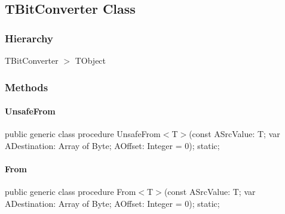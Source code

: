 \documentclass{report}
\newif\ifpdf
\begin{document}
\subsection*{TBitConverter Class}
\fi
\label{ok_generic.TBitConverter}
\subsubsection*{\large{\textbf{Hierarchy}}\normalsize\hspace{1ex}\hfill}
TBitConverter {$>$} TObject
\subsubsection*{\large{\textbf{Methods}}\normalsize\hspace{1ex}\hfill}
\paragraph*{UnsafeFrom}\hspace*{\fill}

\label{ok_generic.TBitConverter-UnsafeFrom}
\begin{list}{}{
\setlength{\itemindent}{0cm}
\setlength{\listparindent}{0cm}
\setlength{\leftmargin}{\evensidemargin}
\addtolength{\leftmargin}{\tmplength}
\settowidth{\labelsep}{X}
\addtolength{\leftmargin}{\labelsep}
\setlength{\labelwidth}{\tmplength}
}
\item[\textbf{Declaration}\hfill]
\ifpdf
\begin{flushleft}
\fi
\begin{ttfamily}
public generic class procedure UnsafeFrom{$<$}T{$>$}(const ASrcValue: T; var ADestination: Array of Byte; AOffset: Integer = 0); static;\end{ttfamily}

\ifpdf
\end{flushleft}
\fi

\end{list}
\paragraph*{From}\hspace*{\fill}

\label{ok_generic.TBitConverter-From}
\begin{list}{}{
\setlength{\itemindent}{0cm}
\setlength{\listparindent}{0cm}
\setlength{\leftmargin}{\evensidemargin}
\addtolength{\leftmargin}{\tmplength}
\settowidth{\labelsep}{X}
\addtolength{\leftmargin}{\labelsep}
\setlength{\labelwidth}{\tmplength}
}
\item[\textbf{Declaration}\hfill]
\ifpdf
\begin{flushleft}
\fi
\begin{ttfamily}
public generic class procedure From{$<$}T{$>$}(const ASrcValue: T; var ADestination: Array of Byte; AOffset: Integer = 0); static;\end{ttfamily}

\ifpdf
\end{flushleft}
\fi

\end{list}
\end{document}

